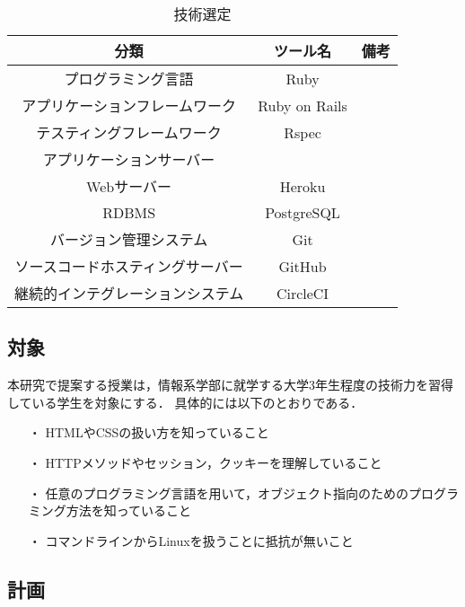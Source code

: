 \begin{table}[ht]
  \begin{center}
    \caption{技術選定}
    \begin{tabular}{|c|c|c|}
      \hline
      分類 & ツール名 & 備考 \\
      \hline
      プログラミング言語 & Ruby & \\
      \hline
      アプリケーションフレームワーク & Ruby on Rails & \\
      \hline
      テスティングフレームワーク & Rspec & \\
      \hline
      アプリケーションサーバー &  & \\
      \cline{1-1}\cline{3-3}
      Webサーバー & Heroku & \\
      \hline
      RDBMS & PostgreSQL & \\
      \hline
      バージョン管理システム & Git & \\
      \hline
      ソースコードホスティングサーバー & GitHub & \\
      \hline
      継続的インテグレーションシステム & CircleCI & \\
      \hline
    \end{tabular}
    \label{tab:技術選定}
  \end{center}
\end{table}

\subsection{対象}

本研究で提案する授業は，情報系学部に就学する大学3年生程度の技術力を習得している学生を対象にする．
具体的には以下のとおりである．

\begin{itemize}
  \item[・] HTMLやCSSの扱い方を知っていること
  \item[・] HTTPメソッドやセッション，クッキーを理解していること
  \item[・] 任意のプログラミング言語を用いて，オブジェクト指向のためのプログラミング方法を知っていること
  \item[・] コマンドラインからLinuxを扱うことに抵抗が無いこと
\end{itemize}

\subsection{計画}

